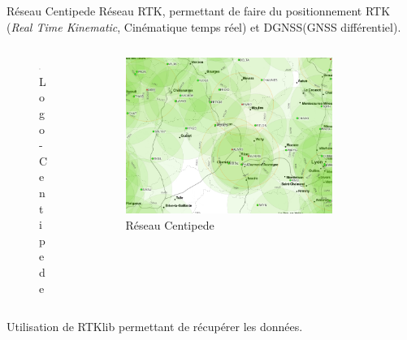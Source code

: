 \documentclass[xcolor=dvipsnames,envcountsect]{beamer}
\begin{document}
\begin{frame}{Réseau Centipede}
	Réseau RTK, permettant de faire du positionnement RTK (\textit{Real Time Kinematic}, Cinématique temps réel) et DGNSS(GNSS différentiel).
	\begin{columns}
		\begin{column}{0.5\textwidth}
			\begin{figure}
				\centering
				\includegraphics[width=0.3\textwidth]{./Figures/centipede.png}
				\caption {Logo - Centipede}
			\end{figure}
		\end{column}
		\begin{column}{0.5\textwidth}
			\begin{figure}
				\centering
				\includegraphics[width=0.8\textwidth]{./Figures/Centipede_map.png}
				\caption {Réseau Centipede}
			\end{figure}
			
		\end{column}
	\end{columns}
	Utilisation de RTKlib permettant de récupérer les données.
\end{frame}
\end{document}
